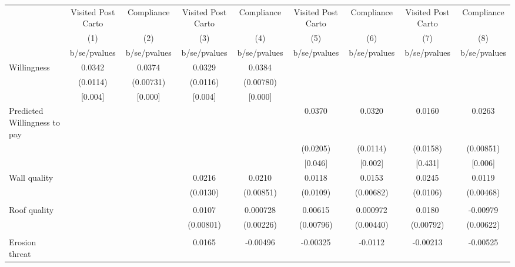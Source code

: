 {
\def\sym#1{\ifmmode^{#1}\else\(^{#1}\)\fi}
\begin{tabular}{l*{8}{c}}
\toprule
                &\multicolumn{1}{c}{Visited Post Carto}&\multicolumn{1}{c}{Compliance}&\multicolumn{1}{c}{Visited Post Carto}&\multicolumn{1}{c}{Compliance}&\multicolumn{1}{c}{Visited Post Carto}&\multicolumn{1}{c}{Compliance}&\multicolumn{1}{c}{Visited Post Carto}&\multicolumn{1}{c}{Compliance}\\
                &\multicolumn{1}{c}{(1)}&\multicolumn{1}{c}{(2)}&\multicolumn{1}{c}{(3)}&\multicolumn{1}{c}{(4)}&\multicolumn{1}{c}{(5)}&\multicolumn{1}{c}{(6)}&\multicolumn{1}{c}{(7)}&\multicolumn{1}{c}{(8)}\\
                &b/se/pvalues&b/se/pvalues&b/se/pvalues&b/se/pvalues&b/se/pvalues&b/se/pvalues&b/se/pvalues&b/se/pvalues\\
\midrule
Willingness     &   0.0342&   0.0374&   0.0329&   0.0384&         &         &         &         \\
                & (0.0114)&(0.00731)& (0.0116)&(0.00780)&         &         &         &         \\
                &  [0.004]&  [0.000]&  [0.004]&  [0.000]&         &         &         &         \\
Predicted Willingness to pay&         &         &         &         &   0.0370&   0.0320&   0.0160&   0.0263\\
                &         &         &         &         & (0.0205)& (0.0114)& (0.0158)&(0.00851)\\
                &         &         &         &         &  [0.046]&  [0.002]&  [0.431]&  [0.006]\\
Wall quality    &         &         &   0.0216&   0.0210&   0.0118&   0.0153&   0.0245&   0.0119\\
                &         &         & (0.0130)&(0.00851)& (0.0109)&(0.00682)& (0.0106)&(0.00468)\\
                &         &         &         &         &         &         &         &         \\
Roof quality    &         &         &   0.0107& 0.000728&  0.00615& 0.000972&   0.0180& -0.00979\\
                &         &         &(0.00801)&(0.00226)&(0.00796)&(0.00440)&(0.00792)&(0.00622)\\
                &         &         &         &         &         &         &         &         \\
Erosion threat  &         &         &   0.0165& -0.00496& -0.00325&  -0.0112& -0.00213& -0.00525\\

\end{tabular}}
